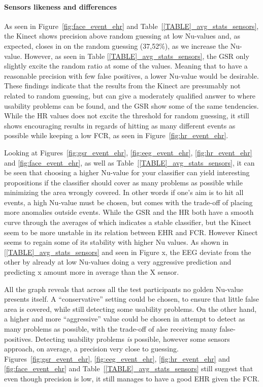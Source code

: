\paragraph{Sensors likeness and differences}

As seen in Figure~\ref{fig:face_event_ehr} and Table~\ref{[TABLE]_avg_stats_sensors}, the Kinect shows precision above random guessing at low Nu-values and,
as expected, closes in on the random guessing (37,52\%), as we increase the Nu-value. However, as seen in Table
\ref{[TABLE]_avg_stats_sensors}, the GSR only slightly excite the random ratio at some of the values. Meaning that
to have a reasonable precision with few false positives, a lower Nu-value would be desirable.
These findings indicate that the results from the Kinect are presumably not related to random guessing, but can give a moderately qualified answer to where usability problems can be found, and the GSR show some of the same tendencies.
While the HR values does not excite the threshold for random guessing, it still shows encouraging results in regards of hitting as many different events as possible while keeping a low FCR, as seen in Figure~\ref{fig:hr_event_ehr}.

Looking at Figures~\ref{fig:gsr_event_ehr}, \ref{fig:eeg_event_ehr}, \ref{fig:hr_event_ehr} and \ref{fig:face_event_ehr},
as well as Table~\ref{[TABLE]_avg_stats_sensors}, it can be seen that choosing a higher Nu-value for your classifier can yield interesting propositions if the classifier should cover as many problems as possible while minimizing the area wrongly covered.
In other words if one's aim is to hit all events, a high Nu-value must be chosen, but comes with the trade-off of placing more anomalies outside events. 
While the GSR and the HR both have a smooth curve through the averages of which indicates a stable classifier, but the Kinect seem to be more unstable in its relation between EHR and FCR. However Kinect seems to regain some of its stability with higher Nu values. As shown in \ref{[TABLE]_avg_stats_sensors} and seen in Figure x, the EEG deviate from the other by already at low Nu-values doing a very aggressive prediction and predicting x amount more in average than the X sensor.

All the graph reveals that across all the test participants no golden Nu-value presents itself. A ``conservative''
setting could be chosen, to ensure that little false area is covered, while still detecting some usability problems. On
the other hand, a higher and more ``aggressive'' value could be chosen in attempt to detect as many problems as
possible, with the trade-off of alse receiving many false-positives. Detecting usability problems \textit{is} possible,
however some sensors approach, on average, a precision very close to guessing.  Figures~\ref{fig:gsr_event_ehr},
\ref{fig:eeg_event_ehr}, \ref{fig:hr_event_ehr} and \ref{fig:face_event_ehr} and Table~\ref{[TABLE]_avg_stats_sensors}
still suggest that even though precision is low, it still manages to have a good EHR given the FCR.

